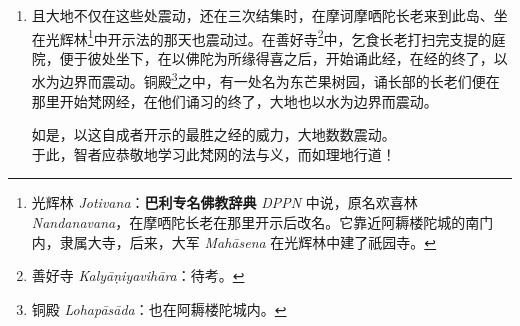 \begin{enumerate}
\item 且大地不仅在这些处震动，还在三次结集时，在摩诃摩哂陀长老来到此岛、坐在光辉林\footnote{光辉林 \textit{Jotivana}：\textbf{巴利专名佛教辞典} \textit{DPPN} 中说，原名欢喜林 \textit{Nandanavana}，在摩哂陀长老在那里开示后改名。它靠近阿耨楼陀城的南门内，隶属大寺，后来，大军 \textit{Mahāsena} 在光辉林中建了祇园寺。}中开示法的那天也震动过。在善好寺\footnote{善好寺 \textit{Kalyāṇiyavihāra}：待考。}中，乞食长老打扫完支提的庭院，便于彼处坐下，在以佛陀为所缘得喜之后，开始诵此经，在经的终了，以水为边界而震动。铜殿\footnote{铜殿 \textit{Lohapāsāda}：也在阿耨楼陀城内。}之中，有一处名为东芒果树园，诵长部的长老们便在那里开始梵网经，在他们诵习的终了，大地也以水为边界而震动。\begin{quoting}如是，以这自成者开示的最胜之经的威力，大地数数震动。\\于此，智者应恭敬地学习此梵网的法与义，而如理地行道！\end{quoting}\end{enumerate}
